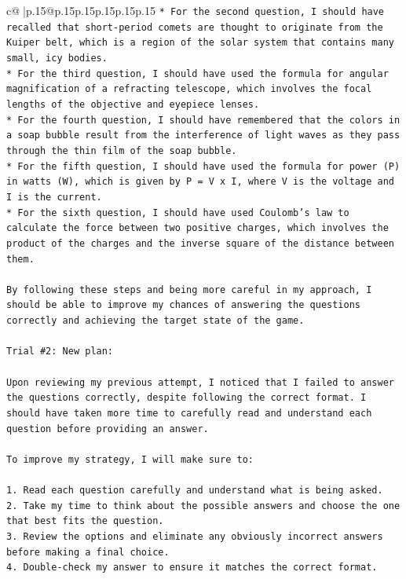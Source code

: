 \documentclass{article}
\begin{document}
{\begin{supertabular}{c@{$\;$}|p{.15\linewidth}@{}p{.15\linewidth}p{.15\linewidth}p{.15\linewidth}p{.15\linewidth}p{.15\linewidth}}
{{{\texttt{* For the second question, I should have recalled that short{-}period comets are thought to originate from the Kuiper belt, which is a region of the solar system that contains many small, icy bodies.} \\
\texttt{* For the third question, I should have used the formula for angular magnification of a refracting telescope, which involves the focal lengths of the objective and eyepiece lenses.} \\
\texttt{* For the fourth question, I should have remembered that the colors in a soap bubble result from the interference of light waves as they pass through the thin film of the soap bubble.} \\
\texttt{* For the fifth question, I should have used the formula for power (P) in watts (W), which is given by P = V x I, where V is the voltage and I is the current.} \\
\texttt{* For the sixth question, I should have used Coulomb's law to calculate the force between two positive charges, which involves the product of the charges and the inverse square of the distance between them.} \\
\\ 
\texttt{By following these steps and being more careful in my approach, I should be able to improve my chances of answering the questions correctly and achieving the target state of the game.} \\
\\ 
\texttt{Trial \#2: New plan: } \\
\\ 
\texttt{Upon reviewing my previous attempt, I noticed that I failed to answer the questions correctly, despite following the correct format. I should have taken more time to carefully read and understand each question before providing an answer. } \\
\\ 
\texttt{To improve my strategy, I will make sure to:} \\
\\ 
\texttt{1. Read each question carefully and understand what is being asked.} \\
\texttt{2. Take my time to think about the possible answers and choose the one that best fits the question.} \\
\texttt{3. Review the options and eliminate any obviously incorrect answers before making a final choice.} \\
\texttt{4. Double{-}check my answer to ensure it matches the correct format.} \\
}}}
\end{supertabular}}
\end{document}
